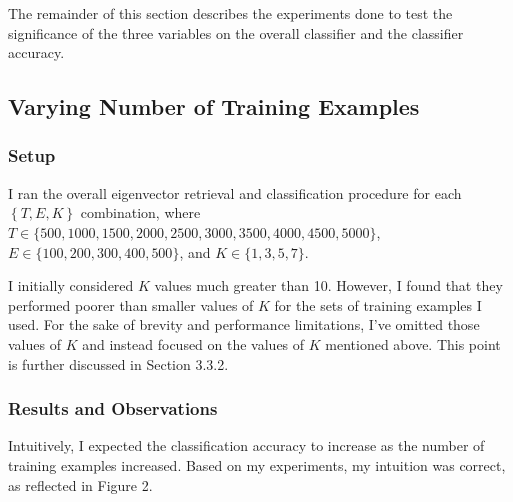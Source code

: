 \documentclass{article} %
\begin{document}
The remainder of this section describes the experiments done to test the significance of the three variables on the overall classifier and the classifier accuracy.

\subsection{Varying Number of Training Examples}

\subsubsection{Setup}

I ran the overall eigenvector retrieval and classification procedure for each \(\left\{ T,E,K \right\}\) combination, where \(T \in \{500,1000,1500,2000,2500,3000,3500,4000,4500,5000\}\), \(E \in \{100, 200, 300, 400, 500\}\), and \(K \in \{1,3,5,7\}\). 

I initially considered \(K\) values much greater than 10. However, I found that they performed poorer than smaller values of \(K\) for the sets of training examples I used. For the sake of brevity and performance limitations, I've omitted those values of \(K\) and instead focused on the values of \(K\) mentioned above. This point is further discussed in Section 3.3.2.

\subsubsection{Results and Observations}

Intuitively, I expected the classification accuracy to increase as the number of training examples increased. Based on my experiments, my intuition was correct, as reflected in Figure 2.
\end{document}
